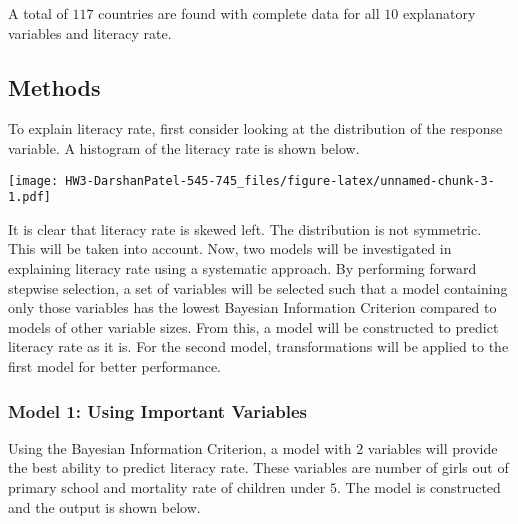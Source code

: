\documentclass[]{article}
\begin{document}
A total of \(117\) countries are found with complete data for all \(10\)
explanatory variables and literacy rate.

\hypertarget{methods}{%
\subsection{Methods}\label{methods}}

To explain literacy rate, first consider looking at the distribution of
the response variable. A histogram of the literacy rate is shown below.

\texttt{[image: HW3-DarshanPatel-545-745\_files/figure-latex/unnamed-chunk-3-1.pdf]}

It is clear that literacy rate is skewed left. The distribution is not
symmetric. This will be taken into account. Now, two models will be
investigated in explaining literacy rate using a systematic approach. By
performing forward stepwise selection, a set of variables will be
selected such that a model containing only those variables has the
lowest Bayesian Information Criterion compared to models of other
variable sizes. From this, a model will be constructed to predict
literacy rate as it is. For the second model, transformations will be
applied to the first model for better performance.

\hypertarget{model-1-using-important-variables}{%
\subsubsection{Model 1: Using Important
Variables}\label{model-1-using-important-variables}}

Using the Bayesian Information Criterion, a model with \(2\) variables
will provide the best ability to predict literacy rate. These variables
are number of girls out of primary school and mortality rate of children
under \(5\). The model is constructed and the output is shown below.
\end{document}
